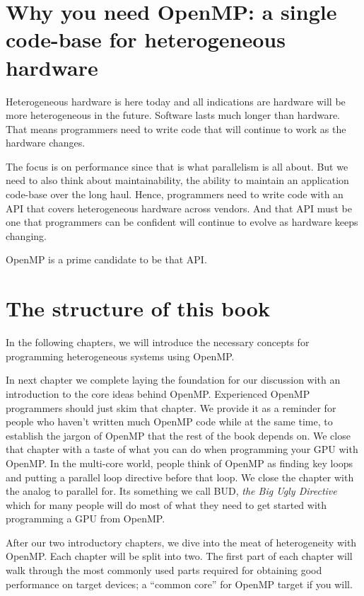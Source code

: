 \section{Why you need OpenMP: a single code-base for heterogeneous hardware}

 Heterogeneous hardware is here today and all indications are hardware will
be more heterogeneous in the future.  Software lasts much longer than hardware.   That means
programmers need to write code that will continue to work as the hardware changes.  

The focus is on performance since that is what parallelism is all about.  But we need to also think about 
maintainability, the ability to maintain an application code-base over the long haul.  Hence, programmers
need to write code with an API that covers heterogeneous hardware across vendors.  And that API
must be one that programmers can be confident will continue to evolve as hardware keeps changing.

OpenMP is a prime candidate to be that API.

\section{The structure of this book}

In the following chapters, we will introduce the necessary concepts for programming heterogeneous systems using OpenMP.

In next chapter we complete laying the foundation for our discussion with an introduction to the core ideas behind OpenMP. 
Experienced OpenMP programmers should just skim that chapter.  We provide 
it as a reminder for people who haven't written much OpenMP code while at the
same time, to establish the jargon of OpenMP that the rest of the book depends on.  We close that chapter with
a taste of what you can do when programming your GPU with OpenMP.   In the multi-core world, people think of OpenMP
as finding key loops and putting a parallel loop directive before that loop.  We close the chapter with the analog to parallel for.  
Its something we call BUD, \emph{the Big Ugly Directive} which for many people will do most of what they need to get started
with programming a GPU from OpenMP.

After our two introductory chapters, we dive into the meat of heterogeneity with OpenMP.  
Each chapter will be split into two.
The first part of each chapter will walk through the most commonly used parts required for obtaining 
good performance on target devices; a ``common core'' for OpenMP target if you will.

